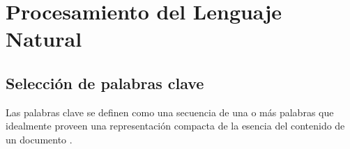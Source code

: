 \chapter{Procesamiento del Lenguaje Natural}
\section{Selecci\'on de palabras clave}
Las palabras clave se definen como una secuencia de una o m\'as palabras que idealmente
proveen una representaci\'on compacta de la esencia del contenido de un
documento \cite{REC10}.
